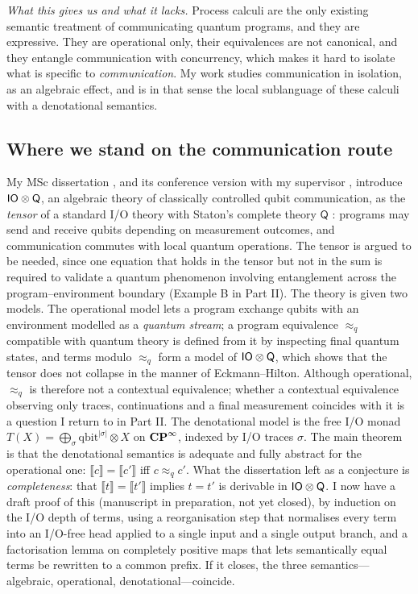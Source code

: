 \emph{What this gives us and what it lacks.} Process calculi are the only existing semantic treatment of communicating quantum programs, and they are expressive. They are operational only, their equivalences are not canonical, and they entangle communication with concurrency, which makes it hard to isolate what is specific to \emph{communication}. My work studies communication in isolation, as an algebraic effect, and is in that sense the local sublanguage of these calculi with a denotational semantics.

\subsection{Where we stand on the communication route}\label{sec:order-wherewestand}

My MSc dissertation \cite{wang_algebraic_2024}, and its conference version with my supervisor , introduce $\mathsf{IO}\otimes\mathsf{Q}$, an algebraic theory of classically controlled qubit communication, as the \emph{tensor} of a standard I/O theory \cite{sums_tensors_HYLAND200670} with Staton's complete theory $\mathsf{Q}$ \cite{statonpopl15}: programs may send and receive qubits depending on measurement outcomes, and communication commutes with local quantum operations. The tensor is argued to be needed, since one equation that holds in the tensor but not in the sum is required to validate a quantum phenomenon involving entanglement across the program--environment boundary (Example B in Part II). The theory is given two models. The operational model lets a program exchange qubits with an environment modelled as a \emph{quantum stream}; a program equivalence $\approx_q$ compatible with quantum theory is defined from it by inspecting final quantum states, and terms modulo $\approx_q$ form a model of $\mathsf{IO}\otimes\mathsf{Q}$, which shows that the tensor does not collapse in the manner of Eckmann--Hilton. Although operational, $\approx_q$ is therefore not a contextual equivalence; whether a contextual equivalence observing only traces, continuations and a final measurement coincides with it is a question I return to in Part II. The denotational model is the free I/O monad $T(X)=\bigoplus_{\sigma}\mathrm{qbit}^{|\sigma|}\otimes X$ on $\mathbf{CP}^{\infty}$, indexed by I/O traces $\sigma$. The main theorem is that the denotational semantics is adequate and fully abstract for the operational one: $\llbracket c\rrbracket = \llbracket c'\rrbracket$ iff $c\approx_q c'$. What the dissertation left as a conjecture is \emph{completeness}: that $\llbracket t\rrbracket=\llbracket t'\rrbracket$ implies $t=t'$ is derivable in $\mathsf{IO}\otimes\mathsf{Q}$. I now have a draft proof of this (manuscript in preparation, not yet closed), by induction on the I/O depth of terms, using a reorganisation step that normalises every term into an I/O-free head applied to a single input and a single output branch, and a factorisation lemma on completely positive maps that lets semantically equal terms be rewritten to a common prefix. If it closes, the three semantics---algebraic, operational, denotational---coincide.

